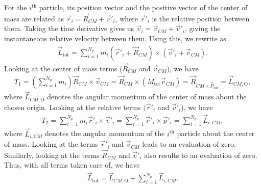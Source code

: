 For the $i^{\text{th}}$ particle, its position vector and the positive vector of the center of mass are related as $\vec{r}_{i} = \vec{R}_{CM} + \vec{r}'_{i}$, where $\vec{r}'_{i}$ is the relative position between them. Taking the time derivative gives us $\vec{v}_{i} = \vec{v}_{CM} + \vec{v}'_{i}$, giving the instantaneous relative velocity between them. Using this, we rewrite as
\begin{align}
    \vec{L}_{\text{tot}} = \sum_{i=1}^{N_{p}} m_{i}(\vec{r}'_{i} + \vec{R}_{CM}) \times (\vec{v}'_{i} + \vec{v}_{CM}).
\end{align}
Looking at the center of mass terms ($\vec{R}_{CM}$ and $\vec{v}_{CM}$), we have
\begin{align}
    T_{1} = \left( \sum_{i=1}^{N_{p}} m_{i} \right) \vec{R}_{CM} \times \vec{v}_{CM} = \vec{R}_{CM} \times (M_{\text{tot}}\vec{v}_{CM}) = \vec{R}_{CM \times \vec{P}_{\text{tot}}} = \vec{L}_{CM,\text{O}},
\end{align}
where $\vec{L}_{CM,\text{O}}$ denotes the angular momentum of the center of mass about the chosen origin. Looking at the relative terms $(\vec{r}'_{i}$ and $\vec{v}'_{i}$), we have
\begin{align}
    T_{2} = \sum_{i=1}^{N_{p}} m_{i} \vec{r}'_{i} \times \vec{v}'_{i} = \sum_{i=1}^{N_{p}} \vec{r}'_{i} \times \vec{p}'_{i} = \sum_{i=1}^{N_{p}} \vec{L}_{i,CM},
\end{align}
where $\vec{L}_{i,CM}$ denotes the angular momentum of the $i^{\text{th}}$ particle about the center of mass. Looking at the terms $\vec{r}'_{i}$ and $\vec{v}_{CM}$ leads to an evaluation of zero. Similarly, looking at the terms $\vec{R}_{CM}$ and $\vec{v}'_{i}$ also results to an evaluation of zero. Thus, with all terms taken care of, we have
\begin{align}
    \vec{L}_{\text{tot}} = \vec{L}_{CM,\text{O}} + \sum_{i=1}^{N_{p}} \vec{L}_{i,CM}.
\end{align}


